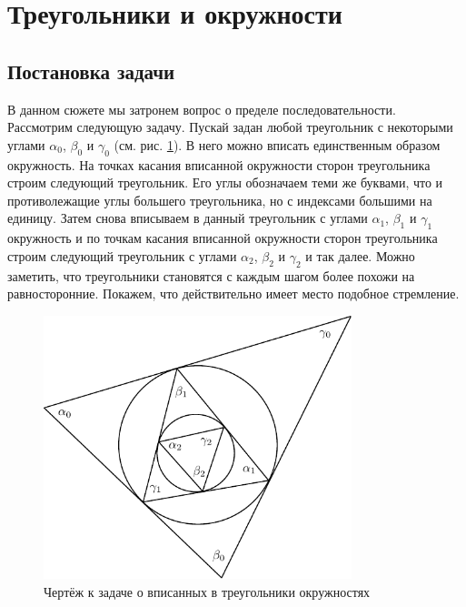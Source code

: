 \documentclass[12pt]{article}
\begin{document}
\section{Треугольники и окружности}
\subsection{Постановка задачи}
В данном сюжете мы затронем вопрос о пределе последовательности. Рассмотрим следующую задачу. Пускай задан любой треугольник с некоторыми углами $\alpha_0$, $\beta_0$ и $\gamma_0$ (см. рис. \ref{fig:6}). В него можно вписать единственным образом окружность. На точках касания вписанной окружности сторон треугольника строим следующий треугольник. Его углы обозначаем теми же буквами, что и противолежащие углы большего треугольника, но с индексами большими на единицу. Затем снова вписываем в данный треугольник с углами $\alpha_1$, $\beta_1$ и $\gamma_1$ окружность и по точкам касания вписанной окружности сторон треугольника строим следующий треугольник с углами $\alpha_2$, $\beta_2$ и $\gamma_2$ и так далее. Можно заметить, что треугольники становятся с каждым шагом более похожи на равносторонние. Покажем, что действительно имеет место подобное стремление.

\begin{figure}[!ht]
	\centering
	\includegraphics[width=0.8\textwidth]{first5.pdf}
	\caption{Чертёж к задаче о вписанных в треугольники окружностях}
	\label{fig:6}
\end{figure}
\end{document}
